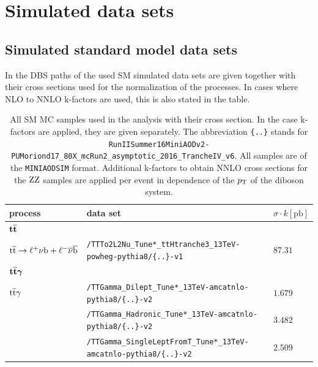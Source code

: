 \chapter{Simulated data sets}
\section*{Simulated standard model data sets}

In  the DBS paths of the used SM simulated data sets are given together with their cross sections used for the normalization of the processes. In cases where NLO to NNLO k-factors are used, this is also stated in the table.

\begin{table}[tb]
 \centering
 \caption{All SM MC samples used in the analysis with their cross section. In the case k-factors are applied, they are given separately. The abbreviation \texttt{\{..\}} stands for \texttt{RunIISummer16MiniAODv2-PUMoriond17\_80X\_mcRun2\_asymptotic\_2016\_TrancheIV\_v6}. All samples are of the \texttt{MINIAODSIM} format. Additional k-factors to obtain NNLO cross sections for the $\mathrm{Z}\mathrm{Z}$ samples are applied per event in dependence of the $p_{\mathrm{T}}$ of the diboson system.}
 \scriptsize
 \label{tab:app_MCsets}
 \begin{tabular}[width=\textwidth]{lll}
  \hline
  \normalsize{process}                             & \normalsize{data set}   & \normalsize{$\sigma\cdot k[\mathrm{pb}]$} \\\hline
  $\boldsymbol{{\mathrm{t}\overline{\mathrm{t}}}}$                            &                         &                                           \\
  ${\mathrm{t}\overline{\mathrm{t}}}\to\ell^{+}\nu\mathrm{b}+\ell^{-}\overline{\nu}\overline{\mathrm{b}}$ & \verb|/TTTo2L2Nu_Tune*_ttHtranche3_13TeV-powheg-pythia8/{..}-v1|  & $87.31$                                   \\
  $\boldsymbol{{\mathrm{t}\overline{\mathrm{t}}}\gamma}$                        &                         &                                           \\
  ${\mathrm{t}\overline{\mathrm{t}}}\gamma$                                     & \verb|/TTGamma_Dilept_Tune*_13TeV-amcatnlo-pythia8/{..}-v2| & $1.679$                                   \\
                                                   & \verb|/TTGamma_Hadronic_Tune*_13TeV-amcatnlo-pythia8/{..}-v2| & $3.482$                                   \\
                                                   & \verb|/TTGamma_SingleLeptFromT_Tune*_13TeV-amcatnlo-pythia8/{..}-v2| & $2.509$                                   \\

\end{tabular}
\end{table}
